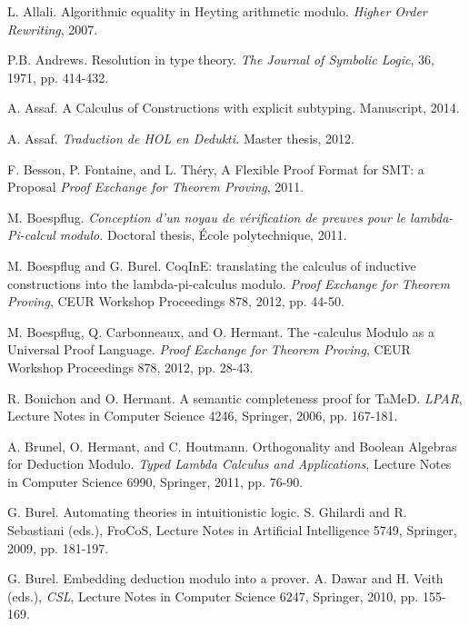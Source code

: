\documentclass{llncs}
\begin{document}


\begin{thebibliography}{99.}
L. Allali.
Algorithmic equality in Heyting arithmetic modulo.
{\em Higher Order Rewriting}, 2007.

P.B. Andrews. 
Resolution in type theory.
{\em The Journal of Symbolic Logic}, 36, 1971, pp. 414-432.

A. Assaf. 
A Calculus of Constructions with explicit subtyping.
Manuscript, 2014.

A. Assaf. 
{\em Traduction de HOL en Dedukti.}
Master thesis, 2012. 

F. Besson, P. Fontaine, and L. Th\'ery, 
A Flexible Proof Format for SMT: a Proposal 
{\em Proof Exchange for Theorem Proving}, 2011. 

M. Boespflug. 
{\em Conception d'un noyau de v\'erification de preuves pour le 
lambda-Pi-calcul modulo.}
Doctoral thesis, \'Ecole polytechnique, 2011. 

M. Boespflug and G. Burel. 
CoqInE: translating the calculus of inductive constructions into the 
lambda-pi-calculus modulo. 
{\em Proof Exchange for 
Theorem Proving}, CEUR Workshop Proceedings 878, 2012, pp. 44-50.

M. Boespflug, Q. Carbonneaux, and O. Hermant.
The -calculus Modulo as a Universal Proof Language.
{\em Proof Exchange for Theorem Proving}, CEUR Workshop Proceedings 878, 
2012, pp. 28-43.

R. Bonichon and O. Hermant.
A semantic completeness proof for TaMeD.
{\em LPAR}, Lecture Notes in Computer  Science 4246, Springer, 2006,
pp. 167-181.

A. Brunel, O. Hermant, and C. Houtmann.
Orthogonality and Boolean Algebras for Deduction Modulo.
{\em Typed Lambda Calculus and Applications}, 
Lecture Notes in Computer Science 6990, Springer, 2011, pp. 76-90. 

G. Burel. Automating theories in intuitionistic logic. S. Ghilardi and R. 
Sebastiani (eds.), FroCoS, Lecture Notes in Artificial Intelligence
5749, Springer, 2009, pp. 181-197.

G. Burel.
Embedding deduction modulo into a prover.
A. Dawar and H. Veith (eds.), {\em CSL}, 
Lecture Notes in Computer Science 6247, Springer, 2010, pp. 155-169. 


\end{thebibliography}
\end{document}
